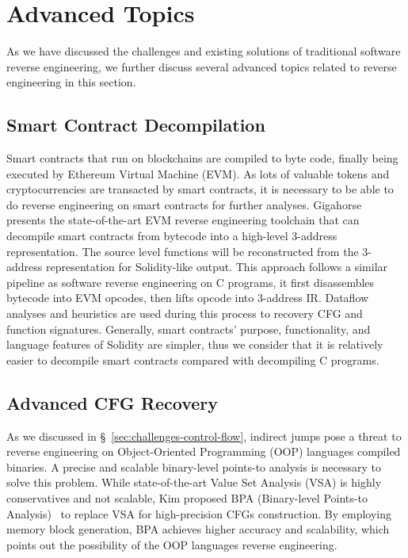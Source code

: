 \chapter{Advanced Topics}\label{sec-advanced}
As we have discussed the challenges and existing solutions of traditional software reverse engineering, we further discuss several advanced topics related to reverse engineering in this section.

\section{Smart Contract Decompilation}\label{sec:advanced-contract}
Smart contracts that run on blockchains are compiled to byte code, finally being executed by Ethereum Virtual Machine (EVM). As lots of valuable tokens and cryptocurrencies are transacted by smart contracts, it is necessary to be able to do reverse engineering on smart contracts for further analyses. Gigahorse~\cite{grech2019gigahorse} presents the state-of-the-art EVM reverse engineering toolchain that can decompile smart contracts from bytecode into a high-level 3-address representation. The source level functions will be reconstructed from the 3-address representation for Solidity-like output. This approach follows a similar pipeline as software reverse engineering on C programs, it first disassembles bytecode into EVM opcodes, then lifts opcode into 3-address IR. Dataflow analyses and heuristics are used during this process to recovery CFG and function signatures.  Generally, smart contracts' purpose, functionality, and language features of Solidity are simpler, thus we consider that it is relatively easier to decompile smart contracts compared with decompiling C programs.


\section{Advanced CFG Recovery}\label{sec:advanced-cfg}
As we discussed in \S~\ref{sec:challenges-control-flow}, indirect jumps pose a threat to reverse engineering on Object-Oriented Programming (OOP) languages compiled binaries. A precise and scalable binary-level points-to analysis is necessary to solve this problem. While state-of-the-art Value Set Analysis (VSA) is highly conservatives and not scalable, Kim \etal proposed BPA (Binary-level Points-to Analysis)~\cite{kim2021refining} to replace VSA for high-precision CFGs construction. By employing memory block generation, BPA achieves higher accuracy and scalability, which points out the possibility of the OOP languages reverse engineering.


